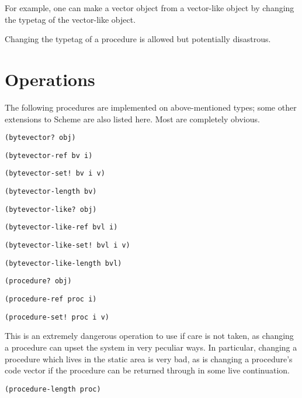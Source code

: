 For example, one can make a vector object from a vector-like object by 
changing the typetag of the vector-like object.

Changing the typetag of a procedure is allowed but potentially disastrous.

\section{Operations}

The following procedures are implemented on above-mentioned types; some other
extensions to Scheme are also listed here. Most are completely obvious.

\begin{description}

\item {\verb+(bytevector? obj)+}

\item {\verb+(bytevector-ref bv i)+}

\item {\verb+(bytevector-set! bv i v)+}

\item {\verb+(bytevector-length bv)+}

\item {\verb+(bytevector-like? obj)+}

\item {\verb+(bytevector-like-ref bvl i)+}

\item {\verb+(bytevector-like-set! bvl i v)+}

\item {\verb+(bytevector-like-length bvl)+}

\item {\verb+(procedure? obj)+}

\item {\verb+(procedure-ref proc i)+}

\item {\verb+(procedure-set! proc i v)+}

This is an extremely dangerous operation to use if care is not taken, as
changing a procedure can upset the system in very peculiar ways. In particular,
changing a procedure which lives in the static area is very bad, as is changing
a procedure's code vector if the procedure can be returned through in some
live continuation.

\item {\verb+(procedure-length proc)+}


\end{description}
